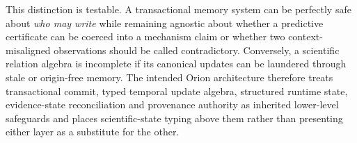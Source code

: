 This distinction is testable. A transactional memory system can be perfectly safe about \emph{who may write} while remaining agnostic about whether a predictive certificate can be coerced into a mechanism claim or whether two context-misaligned observations should be called contradictory. Conversely, a scientific relation algebra is incomplete if its canonical updates can be laundered through stale or origin-free memory. The intended Orion architecture therefore treats transactional commit, typed temporal update algebra, structured runtime state, evidence-state reconciliation and provenance authority as inherited lower-level safeguards and places scientific-state typing above them rather than presenting either layer as a substitute for the other.
